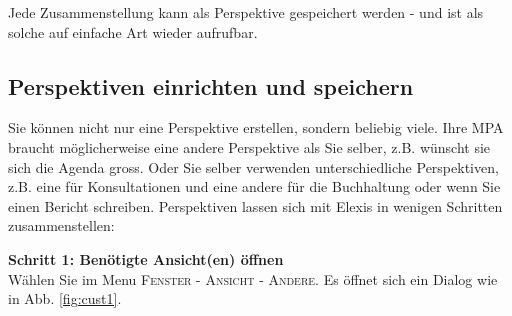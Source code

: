 Jede Zusammenstellung kann als Perspektive gespeichert werden - und ist als
solche auf einfache Art wieder aufrufbar.

\subsection{Perspektiven einrichten und speichern}
\label{tour:customize}
Sie können nicht nur eine Perspektive erstellen, sondern beliebig viele. Ihre MPA braucht möglicherweise eine andere Perspektive als Sie selber, z.B. wünscht sie sich die Agenda gross. Oder Sie selber verwenden unterschiedliche Perspektiven, z.B. eine für Konsultationen und eine andere für die Buchhaltung oder wenn Sie einen Bericht schreiben. Perspektiven lassen sich mit Elexis in wenigen Schritten zusammenstellen:\\

\bigskip

\textbf{Schritt 1: Benötigte Ansicht(en) öffnen}\\

Wählen Sie im Menu \textsc{Fenster - Ansicht - Andere}. Es öffnet sich ein Dialog wie in Abb. \ref{fig:cust1}.\\

